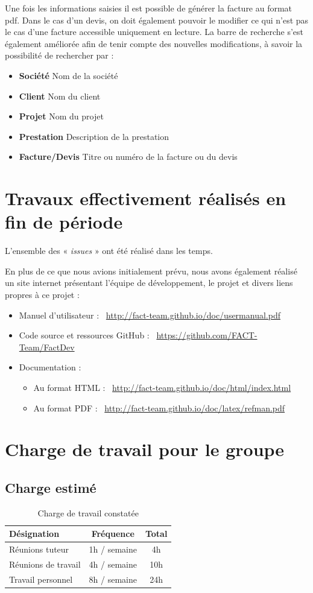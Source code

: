 \documentclass[12pt,a4paper,openany]{article}
\begin{document}
	Une fois les informations saisies il est possible de générer la facture au format pdf.
	Dans le cas d'un devis, on doit également pouvoir le modifier ce qui n'est pas le cas d'une facture accessible uniquement en lecture.
	La barre de recherche s'est également améliorée afin de tenir compte des nouvelles modifications, à savoir la possibilité de rechercher par : 
	\begin{itemize}
		\item \textbf{Société} Nom de la société
		\item \textbf{Client} Nom du client
		\item \textbf{Projet} Nom du projet
		\item \textbf{Prestation} Description de la prestation
		\item \textbf{Facture/Devis} Titre ou numéro de la facture ou du devis
	\end{itemize}  
	
	\section{Travaux effectivement réalisés en fin de période}
	L'ensemble des « \textit{issues} » ont été réalisé dans les temps. 
	
	En plus de ce que nous avions initialement prévu, nous avons également réalisé un site internet présentant l'équipe de développement, le projet et
	divers liens propres à ce projet :
	\begin{itemize}
		\item Manuel d’utilisateur : \Mundus~\url{http://fact-team.github.io/doc/usermanual.pdf}
		\item Code source et ressources GitHub : \Mundus~\url{https://github.com/FACT-Team/FactDev}
		\item Documentation :
			\begin{itemize}
				\item Au format HTML : \Mundus~\url{http://fact-team.github.io/doc/html/index.html}
				\item Au format PDF :  \Mundus~\url{http://fact-team.github.io/doc/latex/refman.pdf}
			\end{itemize}
	\end{itemize}

	\section{Charge de travail pour le groupe}
	\subsection{Charge estimé}
	\begin{table}[H]
		\centering
		\begin{tabular}{l|c|c}
			\textbf{Désignation} & \textbf{Fréquence} & \textbf{Total}\\
			\hline
			Réunions tuteur & 1h / semaine & 4h\\
			Réunions de travail & 4h / semaine & 10h\\
			Travail personnel & 8h / semaine & 24h
		\end{tabular}
		\caption{Charge de travail constatée}
	\end{table}
\end{document}
